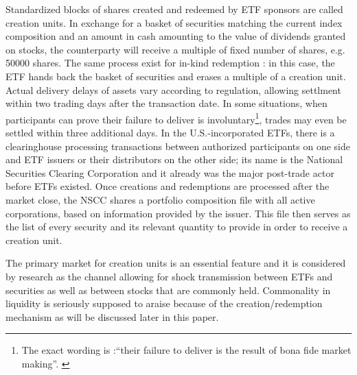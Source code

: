 Standardized blocks of shares created and redeemed by ETF sponsors are called creation units. In exchange for a basket of securities matching the current index composition and an amount in cash amounting to the value of dividends granted on stocks, the counterparty will receive a multiple of fixed number of shares, e.g. 50000 shares. The same process exist for in-kind redemption : in this case, the ETF hands back the basket of securities and erases a multiple of a creation unit. Actual delivery delays of assets vary according to regulation, allowing settlment within two trading days after the transaction date. In some situations, when participants can prove their failure to deliver is involuntary\footnote{The exact wording is :``their failure to deliver is the result of bona fide market making''. \parencite{Ben-David2017}}, trades may even be settled within three additional days. In the U.S.-incorporated ETFs, there is a clearinghouse processing transactions between authorized participants on one side and ETF issuers or their distributors on the other side; its name is the National Securities Clearing Corporation and it already was the major post-trade actor before ETFs existed. Once creations and redemptions are processed after the market close, the NSCC shares a portfolio composition file with all active corporations, based on information provided by the issuer. This file then serves as the list of every security and its relevant quantity to provide in order to receive a creation unit.

The primary market for creation units is an essential feature and it is considered by research as the channel allowing for shock transmission between ETFs and securities as well as between stocks that are commonly held. Commonality in liquidity is seriously supposed to araise because of the creation/redemption mechanism as will be discussed later in this paper.

